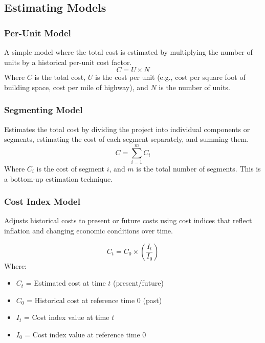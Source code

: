 \documentclass[12pt,a4paper]{article}
\begin{document}
\subsection{Estimating Models}

\subsubsection{Per-Unit Model}
A simple model where the total cost is estimated by multiplying the number of units by a historical per-unit cost factor.
\begin{equation}
  C = U \times N
\end{equation}
Where $C$ is the total cost, $U$ is the cost per unit (e.g., cost per square foot of building space, cost per mile of highway), and $N$ is the number of units.

\subsubsection{Segmenting Model}
Estimates the total cost by dividing the project into individual components or segments, estimating the cost of each segment separately, and summing them.
\begin{equation}
  C = \sum_{i=1}^{m} C_i
\end{equation}
Where $C_i$ is the cost of segment $i$, and $m$ is the total number of segments. This is a bottom-up estimation technique.

\subsubsection{Cost Index Model}
Adjusts historical costs to present or future costs using cost indices that reflect inflation and changing economic conditions over time.

\begin{tcolorbox}[formulabox, title={\textbf{Cost Index Formula}}]
\begin{equation}
  C_t = C_0 \times \left( \frac{I_t}{I_0} \right)
\end{equation}
Where:
\begin{itemize}[leftmargin=1.5em, itemsep=1pt, topsep=2pt]
  \item[] $C_t$ = Estimated cost at time $t$ (present/future)
  \item[] $C_0$ = Historical cost at reference time $0$ (past)
  \item[] $I_t$ = Cost index value at time $t$
  \item[] $I_0$ = Cost index value at reference time $0$
\end{itemize}
\end{tcolorbox}
\end{document}
